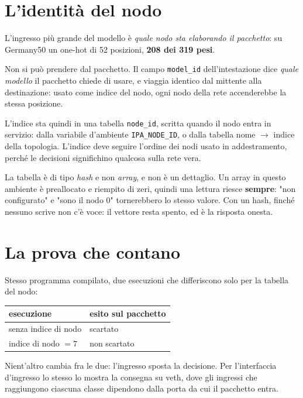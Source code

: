 \documentclass[11pt,a4paper,oneside]{report}
\begin{document}
\section{L'identità del nodo}

L'ingresso più grande del modello è \emph{quale nodo sta elaborando il
pacchetto}: su Germany50 un one-hot di 52 posizioni, \textbf{208 dei 319 pesi}.

Non si può prendere dal pacchetto. Il campo \texttt{model\_id} dell'intestazione
dice \emph{quale modello} il pacchetto chiede di usare, e viaggia identico dal
mittente alla destinazione: usato come indice del nodo, ogni nodo della rete
accenderebbe la stessa posizione.

L'indice sta quindi in una tabella \texttt{node\_id}, scritta quando il nodo
entra in servizio: dalla variabile d'ambiente \texttt{IPA\_NODE\_ID}, o dalla
tabella nome $\to$ indice della topologia. L'indice deve seguire l'ordine dei
nodi usato in addestramento, perché le decisioni significhino qualcosa sulla
rete vera.

La tabella è di tipo \emph{hash} e non \emph{array}, e non è un dettaglio. Un
array in questo ambiente è preallocato e riempito di zeri, quindi una lettura
riesce \textbf{sempre}: "non configurato" e "sono il nodo 0" tornerebbero lo
stesso valore. Con un hash, finché nessuno scrive non c'è voce: il vettore resta
spento, ed è la risposta onesta.

\section{La prova che contano}

Stesso programma compilato, due esecuzioni che differiscono solo per la tabella
del nodo:

\begin{center}
\small
\begin{tabular}{@{}ll@{}}
\toprule
\textbf{esecuzione} & \textbf{esito sul pacchetto} \\
\midrule
senza indice di nodo & scartato \\
indice di nodo $= 7$ & non scartato \\
\bottomrule
\end{tabular}
\end{center}

Nient'altro cambia fra le due: l'ingresso sposta la decisione. Per
l'interfaccia d'ingresso lo stesso lo mostra la consegna su veth, dove gli
ingressi che raggiungono ciascuna classe dipendono dalla porta da cui il
pacchetto entra.
\end{document}
